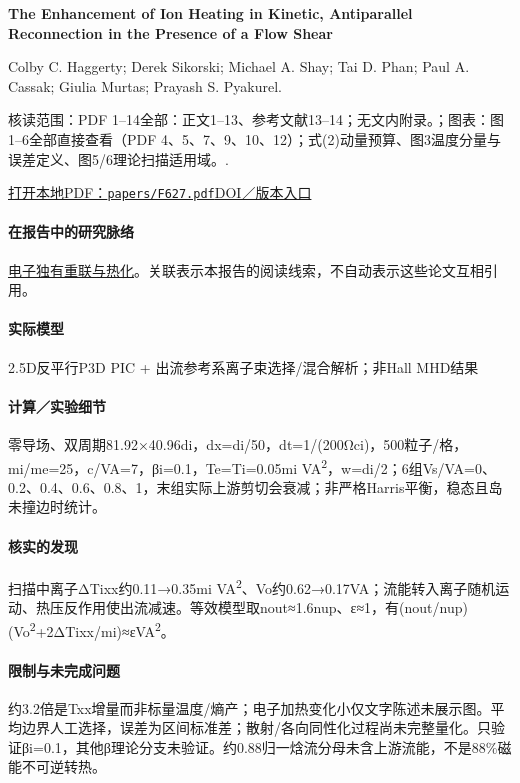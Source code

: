 \documentclass[UTF8,a4paper,11pt,openany,fontset=fandol]{ctexbook}
\begin{document}
\textbf{The Enhancement of Ion Heating in Kinetic,  Antiparallel Reconnection in the Presence of a Flow Shear}\citep{F627}\

Colby C. Haggerty;  Derek Sikorski;  Michael A. Shay;  Tai D. Phan;  Paul A. Cassak;  Giulia Murtas;  Prayash S. Pyakurel.

\textsf{核读范围：}PDF 1–14全部：正文1–13、参考文献13–14；无文内附录。；\textsf{图表：}图1–6全部直接查看（PDF 4、5、7、9、10、12）；式(2)动量预算、图3温度分量与误差定义、图5/6理论扫描适用域。.

\href{run:../papers/F627.pdf}{打开本地PDF：\texttt{papers/F627.pdf}}\quad\href{https://doi.org/10.3847/1538-4357/ae2014}{DOI／版本入口}

\paragraph{在报告中的研究脉络}\hyperref[story:energy]{电子独有重联与热化}。关联表示本报告的阅读线索，不自动表示这些论文互相引用。

\paragraph{实际模型}2.5D反平行P3D PIC + 出流参考系离子束选择/混合解析；非Hall MHD结果

\paragraph{计算／实验细节}零导场、双周期81.92×40.96di，dx=di/50，dt=1/(200Ωci)，500粒子/格，mi/me=25，c/VA=7，βi=0.1，Te=Ti=0.05mi VA\textsuperscript{2}，w=di/2；6组Vs/VA=0、0.2、0.4、0.6、0.8、1，末组实际上游剪切会衰减；非严格Harris平衡，稳态且岛未撞边时统计。

\paragraph{核实的发现}扫描中离子ΔTixx约0.11→0.35mi VA\textsuperscript{2}、Vo约0.62→0.17VA；流能转入离子随机运动、热压反作用使出流减速。等效模型取nout≈1.6nup、ε≈1，有(nout/nup)(Vo\textsuperscript{2}+2ΔTixx/mi)≈εVA\textsuperscript{2}。

\paragraph{限制与未完成问题}约3.2倍是Txx增量而非标量温度/熵产；电子加热变化小仅文字陈述未展示图。平均边界人工选择，误差为区间标准差；散射/各向同性化过程尚未完整量化。只验证βi=0.1，其他β理论分支未验证。约0.88归一焓流分母未含上游流能，不是88\%磁能不可逆转热。
\end{document}
